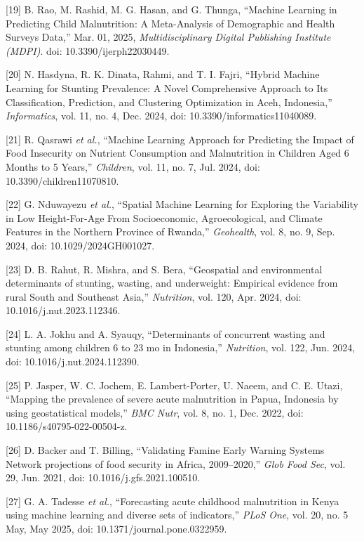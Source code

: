 \documentclass[
]{report}
\begin{document}
{[}19{]} B. Rao, M. Rashid, M. G. Hasan, and G. Thunga, ``Machine
Learning in Predicting Child Malnutrition: A Meta-Analysis of
Demographic and Health Surveys Data,'' Mar. 01, 2025,
\emph{Multidisciplinary Digital Publishing Institute (MDPI)}. doi:
10.3390/ijerph22030449.

{[}20{]} N. Hasdyna, R. K. Dinata, Rahmi, and T. I. Fajri, ``Hybrid
Machine Learning for Stunting Prevalence: A Novel Comprehensive Approach
to Its Classification, Prediction, and Clustering Optimization in Aceh,
Indonesia,'' \emph{Informatics}, vol. 11, no. 4, Dec. 2024, doi:
10.3390/informatics11040089.

{[}21{]} R. Qasrawi \emph{et al.}, ``Machine Learning Approach for
Predicting the Impact of Food Insecurity on Nutrient Consumption and
Malnutrition in Children Aged 6 Months to 5 Years,'' \emph{Children},
vol. 11, no. 7, Jul. 2024, doi: 10.3390/children11070810.

{[}22{]} G. Nduwayezu \emph{et al.}, ``Spatial Machine Learning for
Exploring the Variability in Low Height-For-Age From Socioeconomic,
Agroecological, and Climate Features in the Northern Province of
Rwanda,'' \emph{Geohealth}, vol. 8, no. 9, Sep. 2024, doi:
10.1029/2024GH001027.

{[}23{]} D. B. Rahut, R. Mishra, and S. Bera, ``Geospatial and
environmental determinants of stunting, wasting, and underweight:
Empirical evidence from rural South and Southeast Asia,''
\emph{Nutrition}, vol. 120, Apr. 2024, doi: 10.1016/j.nut.2023.112346.

{[}24{]} L. A. Jokhu and A. Syauqy, ``Determinants of concurrent wasting
and stunting among children 6 to 23 mo in Indonesia,'' \emph{Nutrition},
vol. 122, Jun. 2024, doi: 10.1016/j.nut.2024.112390.

{[}25{]} P. Jasper, W. C. Jochem, E. Lambert-Porter, U. Naeem, and C. E.
Utazi, ``Mapping the prevalence of severe acute malnutrition in Papua,
Indonesia by using geostatistical models,'' \emph{BMC Nutr}, vol. 8, no.
1, Dec. 2022, doi: 10.1186/s40795-022-00504-z.

{[}26{]} D. Backer and T. Billing, ``Validating Famine Early Warning
Systems Network projections of food security in Africa, 2009--2020,''
\emph{Glob Food Sec}, vol. 29, Jun. 2021, doi:
10.1016/j.gfs.2021.100510.

{[}27{]} G. A. Tadesse \emph{et al.}, ``Forecasting acute childhood
malnutrition in Kenya using machine learning and diverse sets of
indicators,'' \emph{PLoS One}, vol. 20, no. 5 May, May 2025, doi:
10.1371/journal.pone.0322959.
\end{document}
